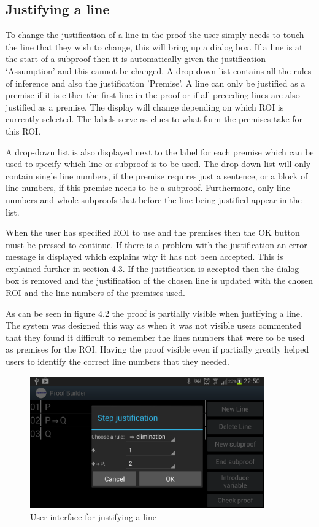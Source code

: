 \subsection{Justifying a line}

To change the justification of a line in the proof the user simply needs to touch the line that they wish to change, this will bring up a dialog box. If a line is at the start of a subproof then it is automatically given the justification `Assumption' and this cannot be changed. A drop-down list contains all the rules of inference and also the justification 'Premise'. A line can only be justified as a premise if it is either the first line in the proof or if all preceding lines are also justified as a premise.  The display will change depending on which ROI is currently selected. The labels serve as clues to what form the premises take for this ROI. 

A drop-down list is also displayed next to the label for each premise which can be used to specify which line or subproof is to be used.  The drop-down list will only contain single line numbers, if the premise requires just a sentence, or a block of line numbers, if this premise needs to be a subproof. Furthermore, only line numbers and whole subproofs that before the line being justified appear in the list. 

When the user has specified ROI to use and the premises then the OK button must be pressed to continue. If there is a problem with the justification an error message is displayed which explains why it has not been accepted. This is explained further in section 4.3. If the justification is accepted then the dialog box is removed and the justification of the chosen line is updated with the chosen ROI and the line numbers of the premises used.

As can be seen in figure 4.2 the proof is partially visible when justifying a line. The system was designed this way as when it was not visible users commented that they found it difficult to remember the lines numbers that were to be used as premises for the ROI. Having the proof visible even if partially greatly helped users to identify the correct line numbers that they needed.

	
\begin{figure}[h!]
\centering
\includegraphics[width=0.9\textwidth]{Images/justification.png}
\caption{User interface for justifying a line}
\label{fig:Compilation}
\end{figure}

